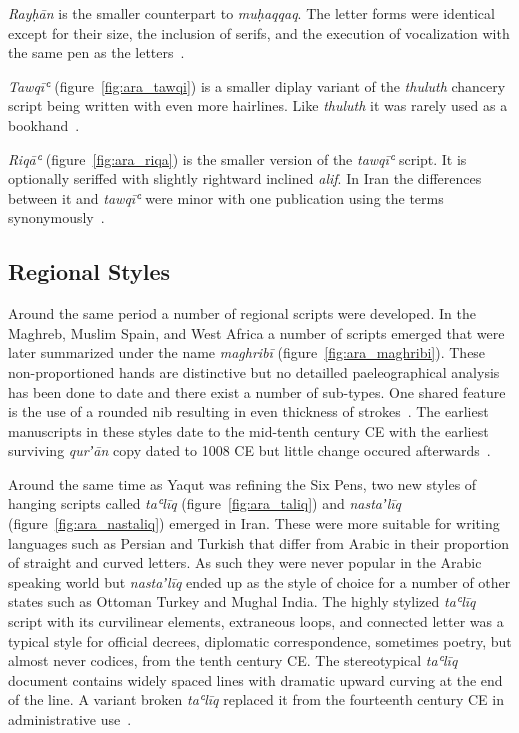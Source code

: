 \emph{Rayḥān} is the smaller counterpart to \emph{muḥaqqaq}. The letter forms
were identical except for their size, the inclusion of serifs, and the
execution of vocalization with the same pen as the letters~\cite[pg.
308]{EncyclopediaofArabicLanguageandLinguisticsVolume3}.

\emph{Tawqīʿ} (figure~\ref{fig:ara_tawqi}) is a smaller diplay variant of the
\emph{thuluth} chancery script being written with even more hairlines. Like
\emph{thuluth} it was rarely used as a bookhand~\cite[pg.
264-264]{gacek2009arabic}.

\emph{Riqāʿ} (figure~\ref{fig:ara_riqa}) is the smaller version of the
\emph{tawqīʿ} script. It is optionally seriffed with slightly rightward
inclined \emph{alif}. In Iran the differences between it and \emph{tawqīʿ} were
minor with one publication using the terms synonymously~\cite[pg.
224]{gacek2009arabic}.

\subsection{Regional Styles}

Around the same period a number of regional scripts were developed. In the
Maghreb, Muslim Spain, and West Africa a number of scripts emerged that were
later summarized under the name \emph{maghribī}
(figure~\ref{fig:ara_maghribi}). These non-proportioned  hands are distinctive
but no detailled paeleographical analysis has been done to date and there exist
a number of sub-types. One shared feature is the use of a rounded nib resulting
in even thickness of strokes~\cite[pg. 147-148]{gacek2009arabic}.  The earliest
manuscripts in these styles date to the mid-tenth century CE with the earliest
surviving \emph{qurʼān} copy dated to 1008 CE but little change occured
afterwards~\cite[pg. 566]{blair2006islamic}.

Around the same time as Yaqut was refining the Six Pens, two new styles of
hanging scripts called \emph{taʿlīq} (figure~\ref{fig:ara_taliq}) and
\emph{nastaʼlīq} (figure~\ref{fig:ara_nastaliq}) emerged in Iran. These were
more suitable for writing languages such as Persian and Turkish that differ
from Arabic in their proportion of straight and curved letters. As such they
were never popular in the Arabic speaking world but \emph{nastaʼlīq} ended up
as the style of choice for a number of other states such as Ottoman Turkey and
Mughal India. The highly stylized \emph{taʿlīq} script with its curvilinear
elements, extraneous loops, and connected letter was a typical style for
official decrees, diplomatic correspondence, sometimes poetry, but almost never
codices, from the tenth century CE. The stereotypical \emph{taʿlīq} document
contains widely spaced lines with dramatic upward curving at the end of the
line. A variant broken \emph{taʿlīq} replaced it from the fourteenth century CE
in administrative use~\cite[pg. 270-273]{blair2006islamic}.


